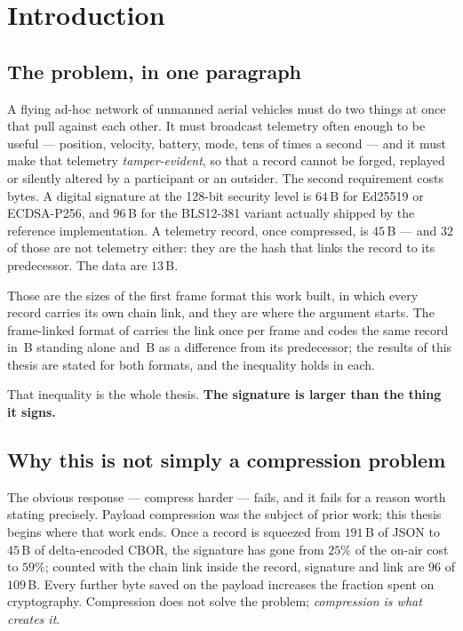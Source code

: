 \chapter{Introduction}\label{ch:intro}

\section{The problem, in one paragraph}

A flying ad-hoc network of unmanned aerial vehicles must do two things at once that pull against
each other. It must broadcast telemetry often enough to be useful --- position, velocity, battery,
mode, tens of times a second --- and it must make that telemetry \emph{tamper-evident}, so that a
record cannot be forged, replayed or silently altered by a participant or an outsider. The second
requirement costs bytes. A digital signature at the 128-bit security level is $64$\,B for Ed25519
or ECDSA-P256, and $96$\,B for the BLS12-381 variant actually shipped by the reference
implementation. A telemetry record, once compressed, is $45$\,B --- and $32$ of those are not
telemetry either: they are the hash that links the record to its predecessor. The data are
$13$\,B.

Those are the sizes of the first frame format this work built, in which every record carries its
own chain link, and they are where the argument starts. The frame-linked format of 
carries the link once per frame and codes the same record in \keyLean\,B standing alone and
\deltaLean\,B as a difference from its predecessor; the results of this thesis are stated for
both formats, and the inequality holds in each.

That inequality is the whole thesis. \textbf{The signature is larger than the thing it signs.}

\section{Why this is not simply a compression problem}

The obvious response --- compress harder --- fails, and it fails for a reason worth stating
precisely. Payload compression was the subject of prior work; this thesis begins where that work
ends. Once a record is squeezed from $191$\,B of JSON to $45$\,B of delta-encoded CBOR, the
signature has gone from $25\%$ of the on-air cost to $59\%$; counted with the chain link inside
the record, signature and link are $96$ of $109$\,B. Every further byte saved
on the payload increases the fraction spent on cryptography. Compression does not solve the
problem; \emph{compression is what creates it}.

